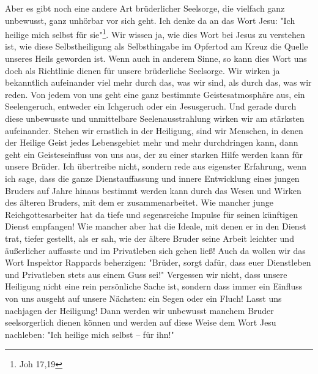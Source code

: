 \documentclass[a5paper,openany]{book}
\begin{document}
Aber es gibt noch eine andere Art brüderlicher Seelsorge, die vielfach ganz unbewusst, ganz unhörbar vor sich geht. Ich denke da an das Wort Jesu: "Ich heilige mich selbst für sie"\footnote{Joh 17,19}. Wir wissen ja, wie dies Wort bei Jesus zu verstehen ist, wie diese Selbstheiligung als Selbsthingabe im Opfertod am Kreuz die Quelle unseres Heils geworden ist. Wenn auch in anderem Sinne, so kann dies Wort uns doch als Richtlinie dienen für unsere brüderliche Seelsorge. Wir wirken ja bekanntlich aufeinander viel mehr durch das, was wir sind, als durch das, was wir reden. Von jedem von uns geht eine ganz bestimmte Geistesatmosphäre aus, ein Seelengeruch, entweder ein Ichgeruch oder ein Jesusgeruch. Und gerade durch diese unbewusste und unmittelbare Seelenausstrahlung wirken wir am stärksten aufeinander. Stehen wir ernstlich in der Heiligung, sind wir Menschen, in denen der Heilige Geist jedes Lebensgebiet mehr und mehr durchdringen kann, dann geht ein Geisteseinfluss von uns aus, der zu einer starken Hilfe werden kann für unsere Brüder. Ich übertreibe nicht, sondern rede aus eigenster Erfahrung, wenn ich sage, dass die ganze Dienstauffassung und innere Entwicklung eines jungen Bruders auf Jahre hinaus bestimmt werden kann durch das Wesen und Wirken des älteren Bruders, mit dem er zusammenarbeitet. Wie mancher junge Reichgottesarbeiter hat da tiefe und segensreiche Impulse für seinen künftigen Dienst empfangen! Wie mancher aber hat die Ideale, mit denen er in den Dienst trat, tiefer gestellt, als er sah, wie der ältere Bruder seine Arbeit leichter und äußerlicher auffasste und im Privatleben sich gehen ließ! Auch da wollen wir das Wort Inspektor Rappards beherzigen: "Brüder, sorgt dafür, dass euer Dienstleben und Privatleben stets aus einem Guss sei!" Vergessen wir nicht, dass unsere Heiligung nicht eine rein persönliche Sache ist, sondern dass immer ein Einfluss von uns ausgeht auf unsere Nächsten: ein Segen oder ein Fluch! Lasst uns nachjagen der Heiligung! Dann werden wir unbewusst manchem Bruder seelsorgerlich dienen können und werden auf diese Weise dem Wort Jesu nachleben: "Ich heilige mich selbst – für ihn!"
\hfill \break
\par
\end{document}

